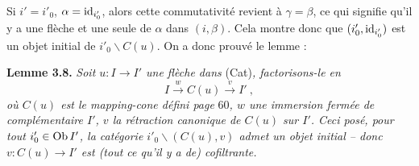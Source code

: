 Si $i' = i'_0$, $\alpha = \mathrm{id}_{i'_0}$, alors cette commutativité revient à $\gamma = \beta$, ce qui signifie qu'il y a une flèche et une seule de $\alpha$ dans $(i,\beta)$. Cela montre donc que $(i'_0,\mathrm{id}_{i'_0})$ est un objet initial de $i'_0\backslash C(u)$. On a donc prouvé le lemme :

\textbf{Lemme 3.8.} \textit{Soit $u : I\longrightarrow I'$ une flèche dans} (Cat)\textit{, factorisons-le en}
\[
I \xrightarrow{\;w\;} C(u) \xrightarrow{\;v\;} I'\ ,
\]
\textit{où $C(u)$ est le mapping-cone défini page} 60\textit{, $w$ une immersion fermée de complémentaire $I'$, $v$ la rétraction canonique de $C(u)$ sur $I'$. Ceci posé, pour tout $i'_0\in\operatorname{Ob} I'$, la catégorie $i'_0\backslash(C(u),v)$ admet un objet initial – donc $v : C(u)\longrightarrow I'$ est (tout ce qu'il y a de) cofiltrante.}

